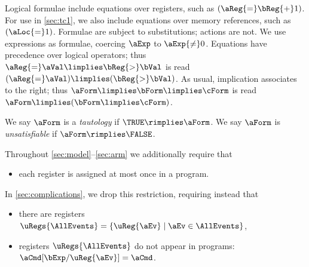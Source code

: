 Logical formulae include equations over registers, such as
$(\aReg{=}\bReg{+}1)$.
For use in \textsection\ref{sec:tc1}, we also include equations over memory references, such as $(\aLoc{=}1)$.
Formulae are subject to substitutions; %
actions are not.
We use expressions as formulae, coercing $\aExp$ to $\aExp{\neq}0$.
Equations have precedence over logical operators; thus
$\aReg{=}\aVal\limplies\bReg{>}\bVal$ is read
$(\aReg{=}\aVal)\limplies(\bReg{>}\bVal)$.  As usual, implication associates to the
right; thus $\aForm\limplies\bForm\limplies\cForm$ is read
$\aForm\limplies(\bForm\limplies\cForm)$.

We say
$\aForm$ is a \emph{tautology} if $\TRUE \rimplies \aForm$.
We say
$\aForm$ is \emph{unsatisfiable} if $\aForm \rimplies \FALSE$.


Throughout \textsection\ref{sec:model}--\ref{sec:arm} we 
additionally require that
\begin{itemize}
\item each register is assigned at most once in a program.
\end{itemize}
In \textsection\ref{sec:complications}, we drop this restriction, requiring
instead that
\begin{itemize}
\item there are registers
  $\uRegs{\AllEvents}=\{\uReg{\aEv}\mid\aEv\in\AllEvents\}$,
\item registers $\uRegs{\AllEvents}$ do not appear in programs: $\aCmd[\bExp/\uReg{\aEv}]=\aCmd$.
\end{itemize}


